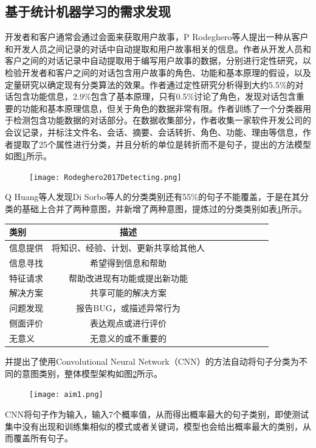 \subsection{基于统计机器学习的需求发现}
开发者和客户通常会通过会面来获取用户故事，P Rodeghero等人\cite{Rodeghero2017Detecting}提出一种从客户和开发人员之间记录的对话中自动提取和用户故事相关的信息。作者从开发人员和客户之间的对话记录中自动提取用于编写用户故事的数据，分别进行定性研究，以检验开发者和客户之间的对话包含用户故事的角色、功能和基本原理的假设，以及定量研究以确定现有分类算法的效果。作者通过定性研究分析得到大约5.5\%的对话包含功能信息，2.9\%包含了基本原理，只有0.5\%讨论了角色，发现对话包含重要的功能和基本原理信息，但关于角色的数据非常有限。作者训练了一个分类器用于检测包含功能数据的对话部分。在数据收集部分，作者收集一家软件开发公司的会议记录，并标注文件名、会话、摘要、会话转折、角色、功能、理由等信息，作者提取了25个属性进行分类，并且分析的单位是转折而不是句子，提出的方法模型如图\ref{fig:Rodeghero2017Detecting}所示。
\begin{figure}[htb]
    \centering
    \texttt{[image: Rodeghero2017Detecting.png]}
    \label{fig:Rodeghero2017Detecting}
\end{figure}

Q Huang等人\cite{Huang2018Automating}发现Di Sorbo等人的分类类别还有55\%的句子不能覆盖，于是在其分类的基础上合并了两种意图，并新增了两种意图，提炼过的分类类别如表\ref{tab:aim0}所示。
\begin{table}[htb]
    \label{tab:aim0}
    \centering
    \footnotesize%
    \setlength{\tabcolsep}{4pt}%
    \renewcommand{\arraystretch}{1.2}%
\begin{tabular}{lcccccccc}
\hline
类别   & 描述                 \\
\hline
信息提供 & 将知识、经验、计划、更新共享给其他人 \\
信息寻找 & 希望得到信息和帮助          \\
特征请求 & 帮助改进现有功能或提出新功能     \\
解决方案 & 共享可能的解决方案          \\
问题发现 & 报告BUG，或描述异常行为      \\
侧面评价 & 表达观点或进行评价          \\
无意义  & 无意义的或不重要的         \\
\hline
\end{tabular}
\end{table}
并提出了使用Convolutional Neural Network（CNN）\cite{kim2014convolutional}的方法自动将句子分类为不同的意图类别，整体模型架构如图\ref{fig:aim1}所示。
\begin{figure}[htb]
    \centering
    \texttt{[image: aim1.png]}
    \label{fig:aim1}
\end{figure}
CNN将句子作为输入，输入7个概率值，从而得出概率最大的句子类别，即使测试集中没有出现和训练集相似的模式或者关键词，模型也会给出概率最大的类别，从而覆盖所有句子。

